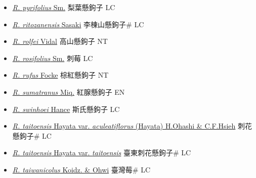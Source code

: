\begin{itemize}
\begin{itemize}
        \item[] \href{http://www.theplantlist.org/tpl1.1/search?q=Rubus+pyrifolius}{\textit{R. pyrifolius} Sm.}   梨葉懸鉤子 LC
        \item[] \href{http://www.theplantlist.org/tpl1.1/search?q=Rubus+ritozanensis}{\textit{R. ritozanensis} Sasaki}   李棟山懸鉤子\# LC
        \item[] \href{http://www.theplantlist.org/tpl1.1/search?q=Rubus+rolfei}{\textit{R. rolfei} Vidal}   高山懸鉤子 NT
        \item[] \href{http://www.theplantlist.org/tpl1.1/search?q=Rubus+rosifolius}{\textit{R. rosifolius} Sm.}   刺莓 LC
        \item[] \href{http://www.theplantlist.org/tpl1.1/search?q=Rubus+rufus}{\textit{R. rufus} Focke}   棕紅懸鉤子 NT
        \item[] \href{http://www.theplantlist.org/tpl1.1/search?q=Rubus+sumatranus}{\textit{R. sumatranus} Miq.}   紅腺懸鉤子 EN
        \item[] \href{http://www.theplantlist.org/tpl1.1/search?q=Rubus+swinhoei}{\textit{R. swinhoei} Hance}   斯氏懸鉤子 LC
        \item[] \href{http://www.theplantlist.org/tpl1.1/search?q=Rubus+taitoensis+var.+aculeatiflorus}{\textit{R. taitoensis} Hayata var. \textit{aculeatiflorus} (Hayata) H.Ohashi \& C.F.Hsieh}   刺花懸鉤子\# LC
        \item[] \href{http://www.theplantlist.org/tpl1.1/search?q=Rubus+taitoensis+var.+taitoensis}{\textit{R. taitoensis} Hayata var. \textit{taitoensis}}   臺東刺花懸鉤子\# LC
        \item[] \href{http://www.theplantlist.org/tpl1.1/search?q=Rubus+taiwanicolus}{\textit{R. taiwanicolus} Koidz. \& Ohwi}   臺灣莓\# LC

\end{itemize}
\end{itemize}
